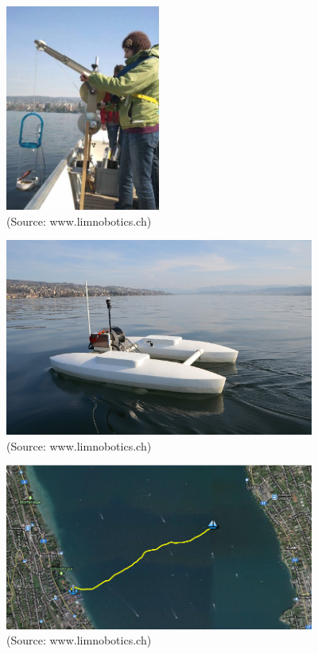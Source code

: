\documentclass[10pt]{beamer}
\begin{document}
\begin{frame}
\begin{center}
\vspace{0.2in}
\includegraphics[width=2in]{figures/manual.jpg}\\[-0.5em]
{\tiny (Source: www.limnobotics.ch)}
\end{center}
\end{frame}

\begin{frame}
\begin{center}
\vspace{0.2in}
\includegraphics[width=4in]{figures/boat.jpg}\\[-0.5em]
{\tiny (Source: www.limnobotics.ch)}
\end{center}
\end{frame}

\begin{frame}
\begin{center}
\vspace{0.2in}
\includegraphics[width=4in]{figures/lake.png}\\[-0.5em]
{\tiny (Source: www.limnobotics.ch)}
\end{center}
\end{frame}
\end{document}
